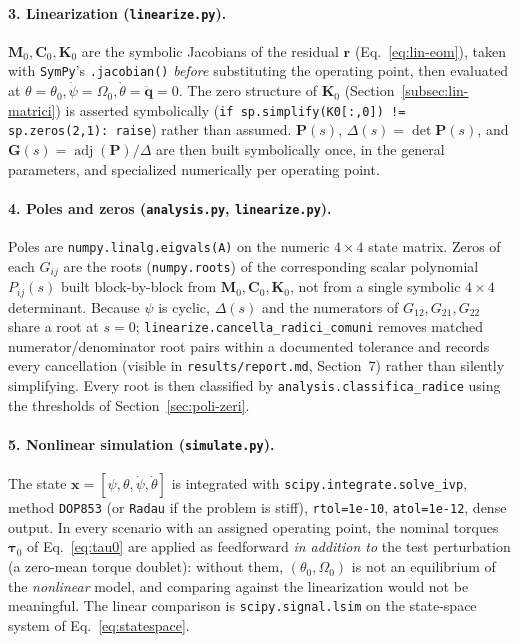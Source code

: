 \documentclass[11pt,a4paper]{article}
\numberwithin{equation}{section}
\newcommand{\bs}[1]{\boldsymbol{#1}}
\begin{document}
\paragraph{3. Linearization (\texttt{linearize.py}).} $\bs M_0,\bs C_0,\bs K_0$ are the symbolic Jacobians of the residual $\bs r$ (Eq.~\eqref{eq:lin-eom}), taken with \texttt{SymPy}'s \texttt{.jacobian()} \emph{before} substituting the operating point, then evaluated at $\theta=\theta_0,\dot\psi=\Omega_0,\dot\theta=\ddot{\bs q}=0$. The zero structure of $\bs K_0$ (Section~\ref{subsec:lin-matrici}) is asserted symbolically (\texttt{if sp.simplify(K0[:,0]) != sp.zeros(2,1): raise}) rather than assumed. $\bs P(s)$, $\Delta(s)=\det\bs P(s)$, and $\bs G(s)=\operatorname{adj}(\bs P)/\Delta$ are then built symbolically once, in the general parameters, and specialized numerically per operating point.

\paragraph{4. Poles and zeros (\texttt{analysis.py}, \texttt{linearize.py}).} Poles are \texttt{numpy.linalg.eigvals(A)} on the numeric $4\times4$ state matrix. Zeros of each $G_{ij}$ are the roots (\texttt{numpy.roots}) of the corresponding scalar polynomial $P_{ij}(s)$ built block-by-block from $\bs M_0,\bs C_0,\bs K_0$, not from a single symbolic $4\times4$ determinant. Because $\psi$ is cyclic, $\Delta(s)$ and the numerators of $G_{12},G_{21},G_{22}$ share a root at $s=0$; \texttt{linearize.cancella\_radici\_comuni} removes matched numerator/denominator root pairs within a documented tolerance and records every cancellation (visible in \texttt{results/report.md}, Section~7) rather than silently simplifying. Every root is then classified by \texttt{analysis.\allowbreak classifica\_\allowbreak radice} using the thresholds of Section~\ref{sec:poli-zeri}.

\paragraph{5. Nonlinear simulation (\texttt{simulate.py}).} The state $\bs x=[\psi,\theta,\dot\psi,\dot\theta]$ is integrated with \texttt{scipy.integrate.solve\_ivp}, method \texttt{DOP853} (or \texttt{Radau} if the problem is stiff), \texttt{rtol=1e-10}, \texttt{atol=1e-12}, dense output. In every scenario with an assigned operating point, the nominal torques $\bs\tau_0$ of Eq.~\eqref{eq:tau0} are applied as feedforward \emph{in addition to} the test perturbation (a zero-mean torque doublet): without them, $(\theta_0,\Omega_0)$ is not an equilibrium of the \emph{nonlinear} model, and comparing against the linearization would not be meaningful. The linear comparison is \texttt{scipy.signal.lsim} on the state-space system of Eq.~\eqref{eq:statespace}.
\end{document}
